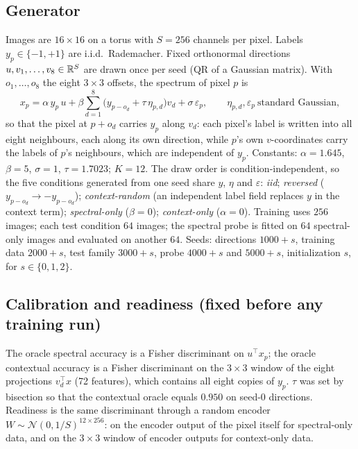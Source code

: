 
\subsection{Generator}
Images are $16\times16$ on a torus with $S=256$ channels per pixel. Labels
$y_p\in\{-1,+1\}$ are i.i.d.\ Rademacher. Fixed orthonormal directions
$u,v_1,\dots,v_8\in\mathbb{R}^S$ are drawn once per seed (QR of a Gaussian matrix).
With $o_1,\dots,o_8$ the eight $3\times3$ offsets, the spectrum of pixel $p$
is
\[
 x_p=\alpha\,y_p\,u+\beta\sum_{d=1}^8\big(y_{p-o_d}+\tau\,\eta_{p,d}\big)v_d+\sigma\,\varepsilon_p,
 \qquad \eta_{p,d},\varepsilon_p\ \text{standard Gaussian},
\]
so that the pixel at $p+o_d$ carries $y_p$ along $v_d$: each pixel's label
is written into all eight neighbours, each along its own direction, while
$p$'s own $v$-coordinates carry the labels of $p$'s neighbours, which are
independent of $y_p$. Constants: $\alpha=1.645$, $\beta=5$, $\sigma=1$,
$\tau=1.7023$; $K=12$. The draw order is condition-independent, so the five
conditions generated from one seed share $y$, $\eta$ and $\varepsilon$:
\emph{iid}; \emph{reversed} ($y_{p-o_d}\to-y_{p-o_d}$); \emph{context-random}
(an independent label field replaces $y$ in the context term);
\emph{spectral-only} ($\beta=0$); \emph{context-only} ($\alpha=0$).
Training uses $256$ images; each test condition $64$ images; the spectral
probe is fitted on $64$ spectral-only images and evaluated on another $64$.
Seeds: directions $1000+s$, training data $2000+s$, test family $3000+s$,
probe $4000+s$ and $5000+s$, initialization $s$, for $s\in\{0,1,2\}$.

\subsection{Calibration and readiness (fixed before any training run)}
The oracle spectral accuracy is a Fisher discriminant on $u^\top x_p$; the
oracle contextual accuracy is a Fisher discriminant on the $3\times3$ window
of the eight projections $v_d^\top x$ (72 features), which contains all eight
copies of $y_p$. $\tau$ was set by bisection so that the contextual oracle
equals $0.950$ on seed-0 directions. Readiness is the same discriminant
through a random encoder $W\sim\mathcal N(0,1/S)^{12\times256}$: on the
encoder output of the pixel itself for spectral-only data, and on the
$3\times3$ window of encoder outputs for context-only data.

